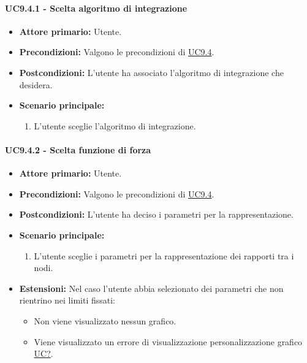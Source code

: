 \paragraph{UC9.4.1 - Scelta algoritmo di integrazione}
\label{sec:UC9.4.1}
    \begin{itemize}
        \item \textbf{Attore primario:} Utente.
        \item \textbf{Precondizioni:} Valgono le precondizioni di \hyperref[sec:UC9.4]{UC9.4}.
	    \item \textbf{Postcondizioni:} L'utente ha associato l'algoritmo di integrazione che desidera.
	    \item \textbf{Scenario principale:} 
	    \begin{enumerate}
	    		\item L'utente sceglie l'algoritmo di integrazione.
		\end{enumerate}
    \end{itemize}
    
\paragraph{UC9.4.2 - Scelta funzione di forza}
\label{sec:UC9.4.2}
    \begin{itemize}
        \item \textbf{Attore primario:} Utente.
        \item \textbf{Precondizioni:} Valgono le precondizioni di \hyperref[sec:UC9.4]{UC9.4}.
	    \item \textbf{Postcondizioni:} L'utente ha deciso i parametri per la rappresentazione.
	    \item \textbf{Scenario principale:} 
	    \begin{enumerate}
	    		\item L'utente sceglie i parametri per la rappresentazione dei rapporti tra i nodi.
		\end{enumerate}
	    \item \textbf{Estensioni:} Nel caso l'utente abbia selezionato dei parametri che non rientrino nei limiti fissati:
              \begin{itemize}
                  \item Non viene visualizzato nessun grafico.
                  \item Viene visualizzato un errore di visualizzazione personalizzazione grafico \hyperref[sec:UC - Errore di personalizzazione]{UC?}.
              \end{itemize}
    \end{itemize}



